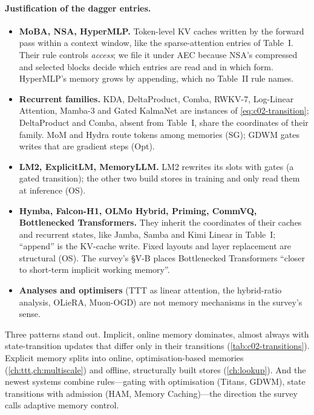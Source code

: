 \paragraph{Justification of the dagger entries.}
\begin{itemize}[itemsep=0pt]
  \item \textbf{MoBA, NSA, HyperMLP.} Token-level KV caches written by the forward pass within a
        context window, like the sparse-attention entries of Table~I. Their rule controls
        \emph{access}; we file it under AEC because NSA's compressed and selected blocks decide
        which entries are read and in which form. HyperMLP's memory grows by appending, which no
        Table~II rule names.
  \item \textbf{Recurrent families.} KDA, DeltaProduct, Comba, RWKV-7, Log-Linear Attention, Mamba-3
        and Gated KalmaNet are instances of \eqref{eq:c02-transition}; DeltaProduct and Comba, absent
        from Table~I, share the coordinates of their family. MoM and Hydra route tokens among
        memories (SG); GDWM gates writes that are gradient steps (Opt).
  \item \textbf{LM2, ExplicitLM, MemoryLLM.} LM2 rewrites its slots with gates (a gated transition);
        the other two build stores in training and only read them at inference (OS).
  \item \textbf{Hymba, Falcon-H1, OLMo Hybrid, Priming, CommVQ, Bottlenecked Transformers.} They
        inherit the coordinates of their caches and recurrent states, like Jamba, Samba and Kimi
        Linear in Table~I; ``append'' is the KV-cache write. Fixed layouts and layer replacement are
        structural (OS). The survey's \S V-B places Bottlenecked Transformers ``closer to short-term
        implicit working memory''.
  \item \textbf{Analyses and optimisers} (TTT as linear attention, the hybrid-ratio analysis, OLieRA,
        Muon-OGD) are not memory mechanisms in the survey's sense.
\end{itemize}

Three patterns stand out. Implicit, online memory dominates, almost always with state-transition
updates that differ only in their transitions (\cref{tab:c02-transitions}). Explicit memory splits
into online, optimisation-based memories (\cref{ch:ttt,ch:multiscale}) and offline, structurally
built stores (\cref{ch:lookup}). And the newest systems combine rules---gating with optimisation
(Titans, GDWM), state transitions with admission (HAM, Memory Caching)---the direction the survey
calls adaptive memory control.

